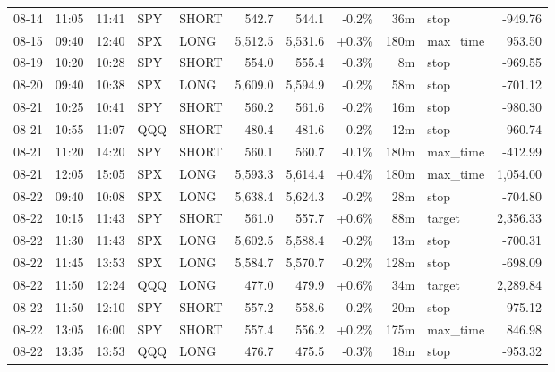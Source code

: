 \documentclass[11pt,a4paper,twoside]{article}
\begin{document}
\begin{center}
\begin{longtable}{>{\color{txtmain}}l l l l l r r r r >{\color{txtmain}}l r}
08-14 & 11:05 & 11:41 & SPY & SHORT & 542.7 & 544.1 & \textcolor{lossred}{-0.2\%} & 36m & stop & \textcolor{lossred}{-949.76} \\
08-15 & 09:40 & 12:40 & SPX & LONG & 5,512.5 & 5,531.6 & \textcolor{wingreen}{+0.3\%} & 180m & max\_time & \textcolor{wingreen}{953.50} \\
08-19 & 10:20 & 10:28 & SPY & SHORT & 554.0 & 555.4 & \textcolor{lossred}{-0.3\%} & 8m & stop & \textcolor{lossred}{-969.55} \\
08-20 & 09:40 & 10:38 & SPX & LONG & 5,609.0 & 5,594.9 & \textcolor{lossred}{-0.2\%} & 58m & stop & \textcolor{lossred}{-701.12} \\
08-21 & 10:25 & 10:41 & SPY & SHORT & 560.2 & 561.6 & \textcolor{lossred}{-0.2\%} & 16m & stop & \textcolor{lossred}{-980.30} \\
08-21 & 10:55 & 11:07 & QQQ & SHORT & 480.4 & 481.6 & \textcolor{lossred}{-0.2\%} & 12m & stop & \textcolor{lossred}{-960.74} \\
08-21 & 11:20 & 14:20 & SPY & SHORT & 560.1 & 560.7 & \textcolor{lossred}{-0.1\%} & 180m & max\_time & \textcolor{lossred}{-412.99} \\
08-21 & 12:05 & 15:05 & SPX & LONG & 5,593.3 & 5,614.4 & \textcolor{wingreen}{+0.4\%} & 180m & max\_time & \textcolor{wingreen}{1,054.00} \\
08-22 & 09:40 & 10:08 & SPX & LONG & 5,638.4 & 5,624.3 & \textcolor{lossred}{-0.2\%} & 28m & stop & \textcolor{lossred}{-704.80} \\
08-22 & 10:15 & 11:43 & SPY & SHORT & 561.0 & 557.7 & \textcolor{wingreen}{+0.6\%} & 88m & target & \textcolor{wingreen}{2,356.33} \\
08-22 & 11:30 & 11:43 & SPX & LONG & 5,602.5 & 5,588.4 & \textcolor{lossred}{-0.2\%} & 13m & stop & \textcolor{lossred}{-700.31} \\
08-22 & 11:45 & 13:53 & SPX & LONG & 5,584.7 & 5,570.7 & \textcolor{lossred}{-0.2\%} & 128m & stop & \textcolor{lossred}{-698.09} \\
08-22 & 11:50 & 12:24 & QQQ & LONG & 477.0 & 479.9 & \textcolor{wingreen}{+0.6\%} & 34m & target & \textcolor{wingreen}{2,289.84} \\
08-22 & 11:50 & 12:10 & SPY & SHORT & 557.2 & 558.6 & \textcolor{lossred}{-0.2\%} & 20m & stop & \textcolor{lossred}{-975.12} \\
08-22 & 13:05 & 16:00 & SPY & SHORT & 557.4 & 556.2 & \textcolor{wingreen}{+0.2\%} & 175m & max\_time & \textcolor{wingreen}{846.98} \\
08-22 & 13:35 & 13:53 & QQQ & LONG & 476.7 & 475.5 & \textcolor{lossred}{-0.3\%} & 18m & stop & \textcolor{lossred}{-953.32} \\

\end{longtable}
\end{center}
\end{document}
